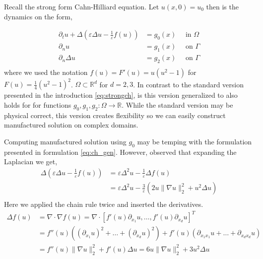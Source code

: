 Recall the strong form Cahn-Hilliard equation. Let $ u( x,0) =  u_{0}$ then is the dynamics on the form,

\begin{equation}
\label{eq:ch_gen}
    \begin{split}
\partial _{t} u + \Delta  \left(  \varepsilon  \Delta u - \frac{1}{\varepsilon }f( u) \right)   &= g_{0}( x)   \quad \text{ in } \Omega  \\
\partial _{n} u &= g_{1}( x)  \quad \text{ on } \Gamma  \\
\partial _{n}    \Delta u   &= g_{2}(x)  \quad \text{ on } \Gamma  \\
    \end{split}
\end{equation}
where we used the notation $f( u) = F'( u) =u( u^2 -1)  $ for $F( u) = \frac{1}{4}( u^{2} - 1)^{2} $. $\Omega \subset \mathbb{R} ^{d} $  for $d = 2,3$. In contrast to the standard version presented in the introduction \eqref{eq:strongch}, is this version
generalized to also holds for for functions $g_{0},g_{1},g_{2}: \Omega \to\mathbb{R}   $. While the standard version may be physical correct, this version creates flexibility so we can easily construct manufactured solution on complex domains.

\begin{remark}
    Computing manufactured solution using $g_{0}$ may be temping with the formulation presented in formulation \eqref{eq:ch_gen}. However, observed that expanding the Laplacian we get,
\[
    \begin{split}
        \Delta  \left(  \varepsilon  \Delta u - \frac{1}{\varepsilon }f( u) \right) & = \varepsilon \Delta^2 u - \frac{1}{\varepsilon } \Delta f( u) \\
                                                                                    &= \varepsilon \Delta ^2 u  - \frac{3}{\varepsilon }( 2u \| \nabla u \|_{ 2 }^{ 2 } + u^{2}  \Delta u )   \\
    \end{split}
\]
Here we applied the chain rule twice and inserted the derivatives.
\[
    \begin{split}
\Delta f( u)  &= \nabla \cdot \nabla f( u)  = \nabla \cdot  \left[ f' ( u) \partial _{x_{1}}u, \ldots, f' ( u) \partial _{x_{d}}u \right] ^{T} \\
& =  f'' ( u)( ( \partial _{x_{1}}u )^{2} + \ldots +( \partial _{x_{d}}u )^{2} ) +  f' ( u)( \partial _{x_{1} x_{1}}u + \ldots +   \partial _{x_{d} x_{d}}u ) \\
&=  f'' ( u) \| \nabla u \|_{ 2 }^{ 2 } + f' ( u)  \Delta u  = 6u \| \nabla u \|_{ 2 }^{ 2 } + 3u^{2}  \Delta u
    \end{split}
\]
\end{remark}


